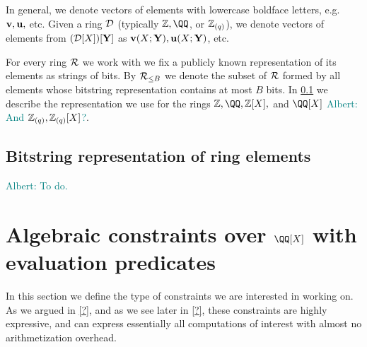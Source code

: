 \documentclass[11pt,letterpaper,usenames,dvipsnames]{article}
\newcommand{\albert}[1]{\textcolor{teal}{Albert: {#1}}}
\begin{document}
In general, we denote vectors of elements with lowercase boldface letters, e.g.\ $\mathbf{v},\mathbf{u},$ etc. Given a ring $\mathcal{D}$ (typically $\ZZ, \QQ$, or $\mathbb{Z}_{(q)}$), we denote vectors of elements from $(\mathcal{D}[X])[\mathbf{Y}]$ as $\mathbf{v}(X;\mathbf{Y}), \mathbf{u}(X;\mathbf{Y})$, etc.


For every ring $\mathcal{R}$ we work with we fix a publicly known representation of its elements as strings of bits. By $\mathcal{R}_{\leq B}$ we denote the subset of $\mathcal{R}$ formed by all elements whose bitstring representation contains at most $B$ bits. In \cref{s: bistring_reps} we describe the representation we use for the rings $\ZZ,\QQ, \ZZ[X],$ and $\QQ[X]$ \albert{And $\mathbb{Z}_{(q)},\mathbb{Z}_{(q)}[X]$?}.

\subsection{Bitstring representation of ring elements}\label{s: bistring_reps}
\albert{To do.}

\section{Algebraic constraints over $\QQ[X]$ with evaluation predicates}

In this section we define the type of constraints we are interested in working on. As we argued in \cref{?}, and as we see later in \cref{?}, these constraints are highly expressive, and can  express essentially all computations of interest with almost no arithmetization overhead.

\newcommand{\evalconstraints}{\text{\emph{Eval}}}
\newcommand{\mainQpolyring}{(\QQ[X]_{\leq B})}
\newcommand{\mainQpolyringmultilin}{(\QQ[X]_{\leq B})^{\multilin}}
\end{document}
